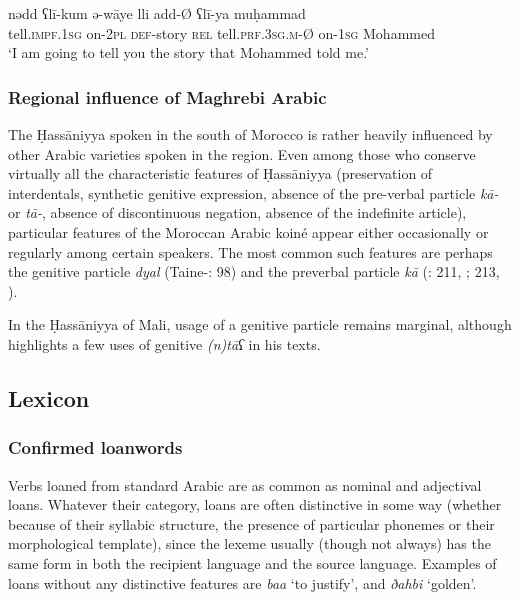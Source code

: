 \documentclass[output=paper]{langsci/langscibook}
\begin{document}
\ea
\gll n{\R}ədd ʕlī-kum ə{\R}-{\R}wāye lli {\R}add-Ø ʕlī-ya muḥammad\\
 tell.\textsc{impf.}1\textsc{sg} on-2\textsc{pl} \textsc{def-}story \textsc{rel} tell.\textsc{prf.3sg.m-}Ø on-\textsc{1sg} Mohammed\\
\glt ‘I am going to tell you the story that Mohammed told me.’ 
\z

\subsubsection{ Regional influence of Maghrebi Arabic} %

The Ḥassāniyya spoken in the south of Morocco is rather heavily influenced by other Arabic varieties spoken in the region. Even among those who conserve virtually all the characteristic features of Ḥassāniyya (preservation of interdentals, synthetic genitive expression, absence of the pre-verbal particle \textit{kā-} or \textit{tā-}, absence of discontinuous negation, absence of the indefinite article), particular features of the Moroccan Arabic koiné appear either occasionally or regularly among certain speakers. The most common such features are perhaps the genitive particle \textit{dyal} (Taine-\citealt{Cheikh1997b}: 98) and the preverbal particle \textit{kā} (\citealt{Aguadé1998}: 211, ; 213, ).

In the Ḥassāniyya of Mali, usage of a genitive particle remains marginal, although \citet[162]{Heath2004} highlights a few uses of genitive \textit{(n)tāʕ} in his texts.

\subsection{ Lexicon} %

\subsubsection{ Confirmed loanwords} %


Verbs loaned from standard Arabic are as common as nominal and adjectival loans. Whatever their category, loans are often distinctive in some way (whether because of their syllabic structure, the presence of particular phonemes or their morphological template), since the lexeme usually (though not always) has the same form in both the recipient language and the source language. Examples of loans without any distinctive features are \textit{ba{\R}{\R}a{\R}} ‘to justify’, and \textit{ðahbi} ‘golden’. 
\end{document}
